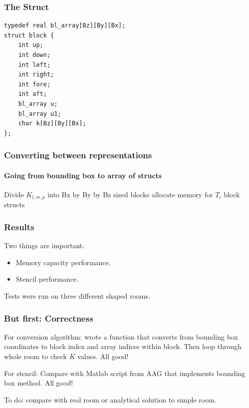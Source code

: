 \documentclass{beamer}
\begin{document}
\begin{frame}[fragile]
	\frametitle{The Struct}
	
	\begin{lstlisting}[caption=The block struct]
typedef real bl_array[Bz][By][Bx];
struct block {
    int up;
    int down;
    int left;
    int right;
    int fore;
    int aft;
    bl_array u;
    bl_array u1;
    char k[Bz][By][Bx];
};
\end{lstlisting}
\end{frame}

\begin{frame}
	\frametitle{Converting between representations}
	\framesubtitle{Going from bounding box to array of structs}
	\IncMargin{1em}

\begin{algorithm}[H]
  \scriptsize
\label{alg:bound-ss}
 Divide $K_{l,m,p}$ into Bx by By by Bz sized blocks\;
 allocate memory for $T_{i}$ block structs\;
 \caption{Convert bounding box to array of blocks}
\end{algorithm}
\end{frame}

\begin{frame}
\frametitle{Results}
Two things are important:
\begin{itemize}
\item Memory capacity performance.
\item Stencil performance.
\end{itemize}

Tests were run on three different shaped rooms.
\end{frame}

\begin{frame}
\frametitle{But first: Correctness}
For conversion algorithm: wrote a function that converts from bounding box coordinates to block index and array indices within block. Then loop through whole room to check $K$ values. All good!
\linebreak

For stencil: Compare with Matlab script from AAG that implements bounding box method. All good!
\linebreak

To do: compare with real room or analytical solution to simple room.
\end{frame}
\end{document}
